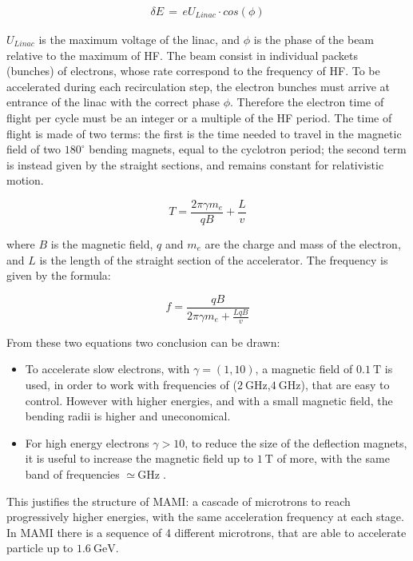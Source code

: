 \begin{align*}
\delta E \, = \, e U_{Linac} \cdot cos(\phi)
\end{align*} 

$U_{Linac}$ is the maximum voltage of the linac, and $\phi$ is the phase of the beam relative to the maximum of HF. The beam consist in individual packets (bunches) of electrons, whose rate correspond to the frequency of HF. To be accelerated during each recirculation step, the electron bunches must arrive at entrance of the linac with the correct phase $\phi$. Therefore the electron time of flight per cycle must be an integer or a multiple of the HF period. The time of flight is made of two terms: the first is the time needed to travel in the magnetic field of two $180^{\circ}$ bending magnets, equal to the cyclotron period; the second term is instead given by the straight sections, and remains constant for relativistic motion. 

\begin{equation} \label{eq:TimeofFlight}
T = \dfrac{2 \pi \gamma m_{e} }{qB} + \dfrac{L}{v}
\end{equation}

where $B$ is the magnetic field, $q$ and $m_{e}$ are the charge and mass of the electron, and $L$ is the length of the straight section of the accelerator. The frequency is given by the formula:

\begin{equation} \label{eq:frequency}
f = \dfrac{qB}{2 \pi \gamma m_{e} + \frac{LqB}{v}} 
\end{equation}

From these two equations two conclusion can be drawn:

\begin{itemize}
\item To accelerate slow electrons, with $\gamma = (1,10)$, a magnetic field of $\SI{0.1}{\tesla}$ is used, in order to work with frequencies of ($\SI{2}{\giga \hertz}$,$\SI{4}{\giga \hertz}$), that are easy to control. However with higher energies, and with a small magnetic field, the bending radii is higher and uneconomical.
\item For high energy electrons $\gamma > 10$, to reduce the size of the deflection magnets, it is useful to increase the magnetic field up to $\SI{1}{\tesla}$ of more, with the same band of frequencies $\simeq \SI{}{\giga \hertz}$.
\end{itemize}

This justifies the structure of MAMI: a cascade of microtrons to reach progressively higher energies, with the same acceleration frequency at each stage. In MAMI there is a sequence of 4 different microtrons, that are able to accelerate particle up to $\SI{1.6}{\giga \electronvolt}$. 

